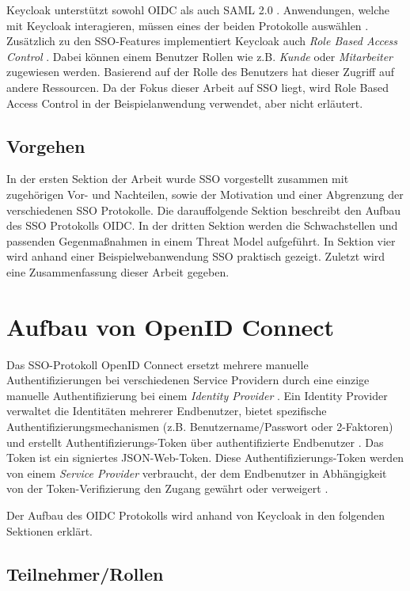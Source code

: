 Keycloak unterstützt sowohl OIDC als auch SAML 2.0 \cite{EB26}. Anwendungen, welche mit Keycloak interagieren, müssen eines der beiden Protokolle auswählen \cite{EB26}. Zusätzlich zu den SSO-Features implementiert Keycloak auch \textit{Role Based Access Control} \cite{EB3}. Dabei können einem Benutzer Rollen wie z.B. \textit{Kunde} oder \textit{Mitarbeiter} zugewiesen werden. Basierend auf der Rolle des Benutzers hat dieser Zugriff auf andere Ressourcen. Da der Fokus dieser Arbeit auf SSO liegt, wird Role Based Access Control in der Beispielanwendung verwendet, aber nicht erläutert.

\subsection{Vorgehen}

In der ersten Sektion der Arbeit wurde SSO vorgestellt zusammen mit zugehörigen Vor- und Nachteilen, sowie der Motivation und einer Abgrenzung der verschiedenen SSO Protokolle. Die darauffolgende Sektion beschreibt den Aufbau des SSO Protokolls OIDC. In der dritten Sektion werden die Schwachstellen und passenden Gegenmaßnahmen in einem Threat Model aufgeführt. In Sektion vier wird anhand einer Beispielwebanwendung SSO praktisch gezeigt. Zuletzt wird eine Zusammenfassung dieser Arbeit gegeben.


\section{Aufbau von OpenID Connect}

Das SSO-Protokoll OpenID Connect ersetzt mehrere manuelle Authentifizierungen bei verschiedenen Service Providern durch eine einzige manuelle Authentifizierung bei einem \textit{Identity Provider} \cite{SSEB_mladenov2016security}. Ein Identity Provider verwaltet die Identitäten mehrerer Endbenutzer, bietet spezifische Authentifizierungsmechanismen (z.B. Benutzername/Passwort oder 2-Faktoren) und erstellt Authentifizierungs-Token über authentifizierte Endbenutzer \cite{SSEB_mladenov2016security}. Das Token ist ein signiertes JSON-Web-Token. Diese Authentifizierungs-Token werden von einem \textit{Service Provider} verbraucht, der dem Endbenutzer in Abhängigkeit von der Token-Verifizierung den Zugang gewährt oder verweigert \cite{SSEB_mladenov2016security}.

Der Aufbau des OIDC Protokolls wird anhand von Keycloak in den folgenden Sektionen erklärt.

\subsection{Teilnehmer/Rollen}

